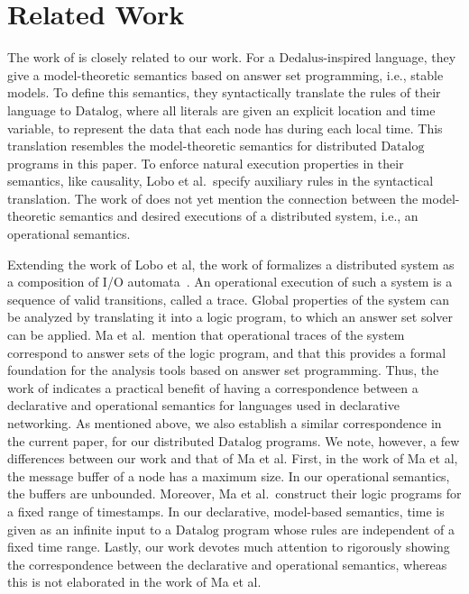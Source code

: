 \documentclass{tlp}
\newcommand{\langname}[1]{\text{#1}}  \newcommand{\pred}[1]{\mathtt{#1}}  \newcommand{\fname}[1]{\mathit{#1}}  \newcommand{\sq}[1]{`{#1}'}
\newcommand{\dedalus}{\langname{Dedalus}}
\newcommand{\datalog}{\langname{Datalog}}
\begin{document}
\section{Related Work}

\label{sec:related-work}



The work of  is closely related to our
work. For a $\dedalus$-inspired language, they give a model-theoretic
semantics based on answer set programming, i.e., stable models. To
define this semantics, they syntactically translate the rules of their
language to $\datalog$, where all literals are given an explicit
location and time variable, to represent the data that each node has
during each local time. This translation resembles the model-theoretic
semantics for distributed $\datalog$ programs in this paper. To enforce
natural execution properties in their semantics, like causality, Lobo
et al.\ specify auxiliary rules in the syntactical translation. The
work of  does not yet mention the connection
between the model-theoretic semantics and desired executions of a
distributed system, i.e., an operational semantics.

Extending the work of Lobo et al, the work of 
formalizes a distributed system as a composition of I/O automata~\cite{lynch_book}.
An operational execution of such a system is a sequence of valid transitions,
called a trace. Global properties of the system can be analyzed by
translating it into a logic program, to which an answer set solver
can be applied. Ma et al.\ mention that operational traces of the
system correspond to answer sets of the logic program, and that this
provides a formal foundation for the analysis tools based on answer
set programming. Thus, the work of 
indicates a practical benefit of having a correspondence between a
declarative and operational semantics for languages used in declarative
networking. As mentioned above, we also establish a similar correspondence
in the current paper, for our distributed $\datalog$ programs. We
note, however, a few differences between our work and that of Ma et
al. First, in the work of Ma et al, the message buffer of a node has
a maximum size. In our operational semantics, the buffers are unbounded.
Moreover, Ma et al.\ construct their logic programs for a fixed range
of timestamps. In our declarative, model-based semantics, time is
given as an infinite input to a $\datalog$ program whose rules are
independent of a fixed time range. Lastly, our work devotes much attention
to rigorously showing the correspondence between the declarative and
operational semantics, whereas this is not elaborated in the work
of Ma et al.
\end{document}

